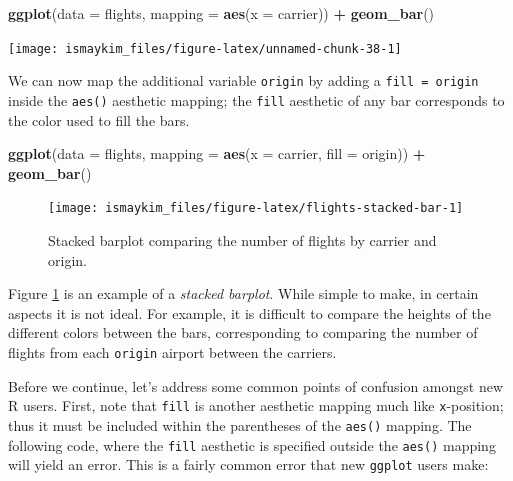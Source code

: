 \documentclass[12pt, krantz2,]{krantz}
\makeatletter
\newenvironment{Shaded}{\begin{snugshade}}{\end{snugshade}}
\newcommand{\DataTypeTok}[1]{\textcolor[rgb]{0.27,0.27,0.27}{#1}}
\newcommand{\KeywordTok}[1]{\textcolor[rgb]{0.27,0.27,0.27}{\textbf{#1}}}
\newcommand{\NormalTok}[1]{#1}
\newcommand{\OperatorTok}[1]{\textcolor[rgb]{0.43,0.43,0.43}{\textbf{#1}}}
\newcommand{\StringTok}[1]{\textcolor[rgb]{0.5,0.5,0.5}{#1}}
\newenvironment{kframe}{%
\medskip{}
\setlength{\fboxsep}{.8em}
 \def\at@end@of@kframe{}%
 \ifinner\ifhmode%
  \def\at@end@of@kframe{\end{minipage}}%
  \begin{minipage}{\columnwidth}%
 \fi\fi%
 \def\FrameCommand##1{\hskip\@totalleftmargin \hskip-\fboxsep
 \colorbox{shadecolor}{##1}\hskip-\fboxsep
     \hskip-\linewidth \hskip-\@totalleftmargin \hskip\columnwidth}%
 \MakeFramed {\advance\hsize-\width
   \@totalleftmargin\z@ \linewidth\hsize
   \@setminipage}}%
 {\par\unskip\endMakeFramed%
 \at@end@of@kframe}
\renewenvironment{Shaded}{\begin{kframe}}{\end{kframe}}
\makeatother
\begin{document}
\begin{Shaded}
\begin{Highlighting}[]
\KeywordTok{ggplot}\NormalTok{(}\DataTypeTok{data =}\NormalTok{ flights, }\DataTypeTok{mapping =} \KeywordTok{aes}\NormalTok{(}\DataTypeTok{x =}\NormalTok{ carrier)) }\OperatorTok{+}
\StringTok{  }\KeywordTok{geom_bar}\NormalTok{()}
\end{Highlighting}
\end{Shaded}

\begin{center}\texttt{[image: ismaykim\_files/figure-latex/unnamed-chunk-38-1]} \end{center}

We can now map the additional variable \texttt{origin} by adding a \texttt{fill\ =\ origin} inside the \texttt{aes()} aesthetic mapping; the \texttt{fill} aesthetic of any bar corresponds to the color used to fill the bars.

\begin{Shaded}
\begin{Highlighting}[]
\KeywordTok{ggplot}\NormalTok{(}\DataTypeTok{data =}\NormalTok{ flights, }\DataTypeTok{mapping =} \KeywordTok{aes}\NormalTok{(}\DataTypeTok{x =}\NormalTok{ carrier, }\DataTypeTok{fill =}\NormalTok{ origin)) }\OperatorTok{+}
\StringTok{  }\KeywordTok{geom_bar}\NormalTok{()}
\end{Highlighting}
\end{Shaded}

\begin{figure}

{\centering \texttt{[image: ismaykim\_files/figure-latex/flights-stacked-bar-1]} 

}

\caption{Stacked barplot comparing the number of flights by carrier and origin.}\label{fig:flights-stacked-bar}
\end{figure}

Figure \ref{fig:flights-stacked-bar} is an example of a \emph{stacked barplot}. While simple to make, in certain aspects it is not ideal. For example, it is difficult to compare the heights of the different colors between the bars, corresponding to comparing the number of flights from each \texttt{origin} airport between the carriers.

Before we continue, let's address some common points of confusion amongst new R users. First, note that \texttt{fill} is another aesthetic mapping much like \texttt{x}-position; thus it must be included within the parentheses of the \texttt{aes()} mapping. The following code, where the \texttt{fill} aesthetic is specified outside the \texttt{aes()} mapping will yield an error. This is a fairly common error that new \texttt{ggplot} users make:
\end{document}
